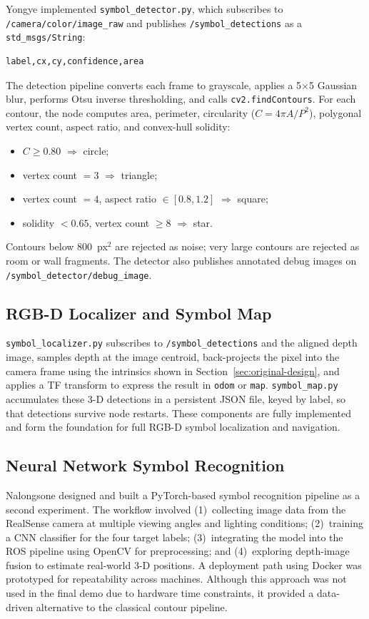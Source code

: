 \documentclass[letterpaper, 10 pt, conference]{ieeeconf/ieeeconf}
\begin{document}
Yongye implemented \texttt{symbol\_detector.py}, which subscribes to
\texttt{/camera/color/image\_raw} and publishes \texttt{/symbol\_detections}
as a \texttt{std\_msgs/String}:
\begin{verbatim}
label,cx,cy,confidence,area
\end{verbatim}

The detection pipeline converts each frame to grayscale, applies a 5$\times$5
Gaussian blur, performs Otsu inverse thresholding, and calls
\texttt{cv2.findContours}.
For each contour, the node computes area, perimeter, circularity
($C = 4\pi A / P^2$), polygonal vertex count, aspect ratio, and convex-hull
solidity:
\begin{itemize}
  \item $C \geq 0.80$ $\Rightarrow$ circle;
  \item vertex count $= 3$ $\Rightarrow$ triangle;
  \item vertex count $= 4$, aspect ratio $\in [0.8, 1.2]$ $\Rightarrow$ square;
  \item solidity $< 0.65$, vertex count $\geq 8$ $\Rightarrow$ star.
\end{itemize}
Contours below 800~px$^2$ are rejected as noise; very large contours are
rejected as room or wall fragments.
The detector also publishes annotated debug images on
\texttt{/symbol\_detector/debug\_image}.

\subsection{RGB-D Localizer and Symbol Map}

\texttt{symbol\_localizer.py} subscribes to \texttt{/symbol\_detections} and
the aligned depth image, samples depth at the image centroid, back-projects
the pixel into the camera frame using the intrinsics shown in
Section~\ref{sec:original-design}, and applies a TF transform to express the
result in \texttt{odom} or \texttt{map}.
\texttt{symbol\_map.py} accumulates these 3-D detections in a persistent JSON
file, keyed by label, so that detections survive node restarts.
These components are fully implemented and form the foundation for full
RGB-D symbol localization and navigation.

\subsection{Neural Network Symbol Recognition}

Nalongsone designed and built a PyTorch-based symbol recognition pipeline
as a second experiment.
The workflow involved (1)~collecting image data from the RealSense camera
at multiple viewing angles and lighting conditions; (2)~training a CNN
classifier for the four target labels; (3)~integrating the model into the
ROS pipeline using OpenCV for preprocessing; and (4)~exploring depth-image
fusion to estimate real-world 3-D positions.
A deployment path using Docker was prototyped for repeatability across
machines.
Although this approach was not used in the final demo due to hardware time
constraints, it provided a data-driven alternative to the classical contour
pipeline.
\end{document}
